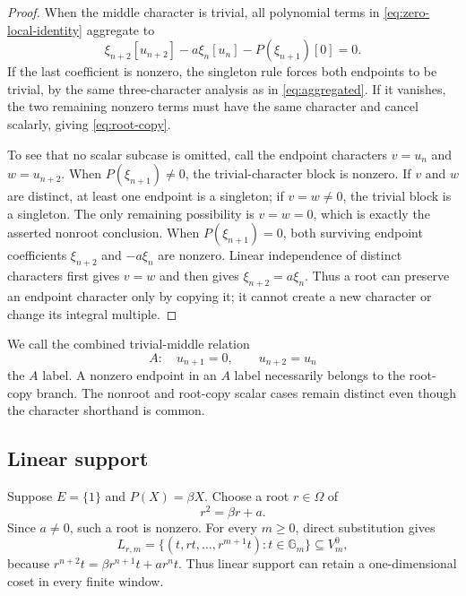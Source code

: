 \documentclass[11pt]{article}
\theoremstyle{definition}
\theoremstyle{remark}
\newcommand{\Gm}{\mathbb{G}_{m}}
\newcommand{\Om}{\Omega}
\begin{document}
\begin{proof}
When the middle character is trivial, all polynomial terms in \eqref{eq:zero-local-identity} aggregate to
\[
\xi_{n+2}[u_{n+2}]-a\xi_n[u_n]-P(\xi_{n+1})[0]=0.
\]
If the last coefficient is nonzero, the singleton rule forces both endpoints to be trivial, by the same three-character analysis as in \eqref{eq:aggregated}.  If it vanishes, the two remaining nonzero terms must have the same character and cancel scalarly, giving \eqref{eq:root-copy}.

To see that no scalar subcase is omitted, call the endpoint characters
$v=u_n$ and $w=u_{n+2}$.  When $P(\xi_{n+1})\neq0$, the trivial-character
block is nonzero.  If $v$ and $w$ are distinct, at least one endpoint is a
singleton; if $v=w\neq0$, the trivial block is a singleton.  The only
remaining possibility is $v=w=0$, which is exactly the asserted nonroot
conclusion.  When $P(\xi_{n+1})=0$, both surviving endpoint coefficients
$\xi_{n+2}$ and $-a\xi_n$ are nonzero.  Linear independence of distinct
characters first gives $v=w$ and then gives
$\xi_{n+2}=a\xi_n$.  Thus a root can preserve an endpoint character only by
copying it; it cannot create a new character or change its integral
multiple.
\end{proof}

We call the combined trivial-middle relation
\begin{equation}
A:\quad u_{n+1}=0,\qquad u_{n+2}=u_n
\label{eq:A-label}
\end{equation}
the $A$ label.  A nonzero endpoint in an $A$ label necessarily belongs to the root-copy branch.  The nonroot and root-copy scalar cases remain distinct even though the character shorthand is common.

\subsection{Linear support}

Suppose $E=\{1\}$ and $P(X)=\beta X$.  Choose a root $r\in\Om$ of
\begin{equation}
r^2=\beta r+a.
\label{eq:linear-root}
\end{equation}
Since $a\neq0$, such a root is nonzero.  For every $m\geq0$, direct substitution gives
\begin{equation}
L_{r,m}=\{(t,rt,\ldots,r^{m+1}t):t\in\Gm\}\subseteq V_m^0,
\label{eq:linear-coset}
\end{equation}
because
$r^{n+2}t=\beta r^{n+1}t+a r^nt$.  Thus linear support can retain a one-dimensional coset in every finite window.
\end{document}
